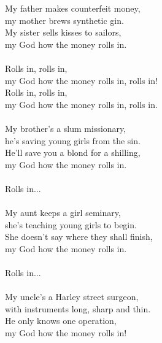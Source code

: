 
My father makes counterfeit money, \\ my mother brews synthetic gin. \\ My sister sells kisses to sailors, \\ my God how the money rolls in. \\ \hspace{10mm} \\ Rolls in, rolls in, \\ my God how the money rolls in, rolls in! \\ Rolls in, rolls in, \\ my God how the money rolls in, rolls in. \\ \hspace{10mm} \\ My brother's a slum missionary, \\ he's saving young girls from the sin. \\ He'll save you a blond for a shilling, \\ my God how the money rolls in. \\ \hspace{10mm} \\ Rolls in... \\ \hspace{10mm} \\ My aunt keeps a girl seminary, \\ she's teaching young girls to begin. \\ She doesn't say where they shall finish, \\ my God how the money rolls in. \\ \hspace{10mm} \\ Rolls in... \\ \hspace{10mm} \\ My uncle's a Harley street surgeon, \\ with instruments long, sharp and thin. \\ He only knows one operation, \\ my God how the money rolls in!